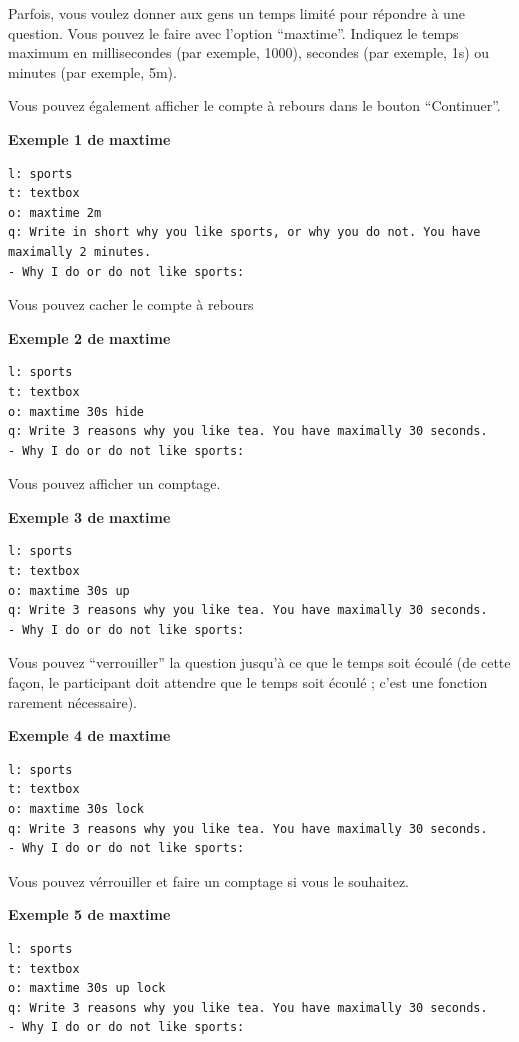 \documentclass[
]{book}
\begin{document}
Parfois, vous voulez donner aux gens un temps limité pour répondre à une question. Vous pouvez le faire avec l'option ``maxtime''. Indiquez le temps maximum en millisecondes (par exemple, 1000), secondes (par exemple, 1s) ou minutes (par exemple, 5m).

Vous pouvez également afficher le compte à rebours dans le bouton ``Continuer''.

\textbf{Exemple 1 de maxtime}

\begin{verbatim}
l: sports
t: textbox
o: maxtime 2m
q: Write in short why you like sports, or why you do not. You have maximally 2 minutes.
- Why I do or do not like sports:
\end{verbatim}

Vous pouvez cacher le compte à rebours

\textbf{Exemple 2 de maxtime}

\begin{verbatim}
l: sports
t: textbox
o: maxtime 30s hide
q: Write 3 reasons why you like tea. You have maximally 30 seconds.
- Why I do or do not like sports:
\end{verbatim}

Vous pouvez afficher un comptage.

\textbf{Exemple 3 de maxtime}

\begin{verbatim}
l: sports
t: textbox
o: maxtime 30s up
q: Write 3 reasons why you like tea. You have maximally 30 seconds.
- Why I do or do not like sports:
\end{verbatim}

Vous pouvez ``verrouiller'' la question jusqu'à ce que le temps soit écoulé (de cette façon, le participant doit attendre que le temps soit écoulé ; c'est une fonction rarement nécessaire).

\textbf{Exemple 4 de maxtime}

\begin{verbatim}
l: sports
t: textbox
o: maxtime 30s lock
q: Write 3 reasons why you like tea. You have maximally 30 seconds.
- Why I do or do not like sports:
\end{verbatim}

Vous pouvez vérrouiller et faire un comptage si vous le souhaitez.

\textbf{Exemple 5 de maxtime}

\begin{verbatim}
l: sports
t: textbox
o: maxtime 30s up lock
q: Write 3 reasons why you like tea. You have maximally 30 seconds.
- Why I do or do not like sports:
\end{verbatim}
\end{document}
